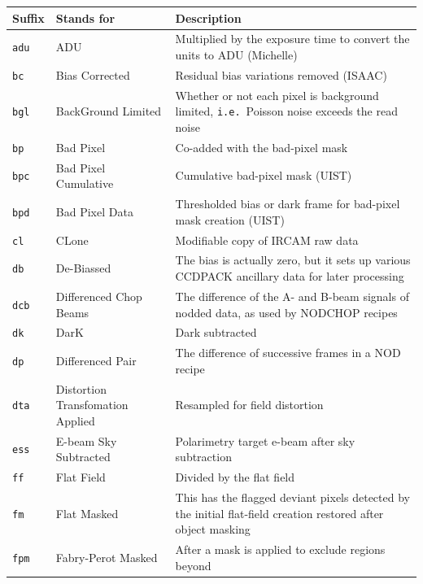 \documentclass[twoside,11pt]{article}
\newcommand{\xref}[3]{#1}
\renewcommand{\_}{\texttt{\symbol{95}}}
\newcommand{\CCDPACK}{{\footnotesize CCDPACK}}
\begin{document}
\begin{tabular}{llp{81mm}}
\hline
  Suffix   & Stands for        & Description \\ \hline
{\tt\_adu} & ADU               & Multiplied by the exposure time to convert
                                 the units to ADU (Michelle) \\
{\tt\_bc}  & Bias Corrected    & Residual bias variations removed (ISAAC) \\
{\tt\_bgl} & BackGround Limited & Whether or not each pixel is background
                                 limited, {\tt{i.e.}}\ Poisson noise exceeds
                                 the read noise \\
{\tt\_bp}  & Bad Pixel         & Co-added with the bad-pixel mask \\
{\tt\_bpc}  & Bad Pixel Cumulative & Cumulative bad-pixel mask (UIST) \\
{\tt\_bpd}  & Bad Pixel Data   & Thresholded bias or dark frame for bad-pixel 
                                 mask creation (UIST) \\
{\tt\_cl}  & CLone             & Modifiable copy of IRCAM raw data \\
{\tt\_db}  & De-Biassed        & The bias is actually zero, but it sets
                                 up various \xref{\CCDPACK}{sun139}{}
                                 ancillary data for later processing \\
{\tt\_dcb} & Differenced Chop Beams & The difference of the A- and B-beam signals
                                 of nodded data, as used by NOD\_CHOP recipes \\
{\tt\_dk}  & DarK              & Dark subtracted \\
{\tt\_dp}  & Differenced Pair  & The difference of successive frames in a
                                 NOD recipe \\
{\tt\_dta}  & Distortion Transfomation Applied & Resampled for field distortion \\
{\tt\_ess} & E-beam Sky Subtracted & Polarimetry target e-beam after sky subtraction \\
{\tt\_ff}  & Flat Field        & Divided by the flat field \\
{\tt\_fm}  & Flat Masked       & This has the flagged deviant pixels
                                 detected by the initial flat-field creation
                                 restored after object masking \\
{\tt\_fpm} & Fabry-Perot Masked & After a mask is applied to exclude regions beyond

\end{tabular}
\end{document}
